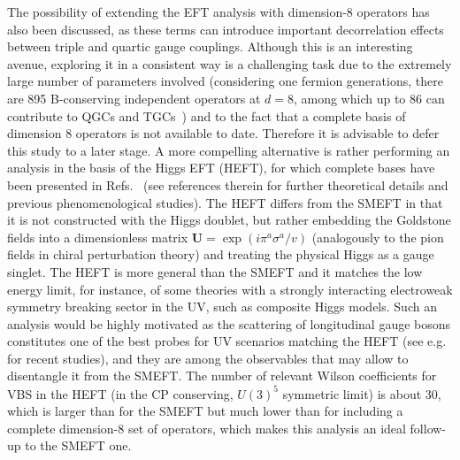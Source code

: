 The possibility of extending the EFT analysis with dimension-8 operators has also been discussed, as these terms can introduce important decorrelation effects between triple and quartic gauge couplings. Although this is an interesting avenue, exploring it in a consistent way is a challenging task due to the extremely large number of parameters involved (considering one fermion generations, there are 895 B-conserving independent operators at $d=8$, among which up to 86 can contribute to QGCs and TGCs~\cite{Henning:2015alf}) and to the fact that a complete basis of dimension 8 operators is not available to date. Therefore it is advisable to defer this study to a later stage. A more compelling alternative is rather performing an analysis in the basis of the Higgs EFT (HEFT), for which complete bases have been presented in Refs.~\cite{Buchalla:2013rka,Brivio:2016fzo} (see references therein for further theoretical details and previous phenomenological studies). The HEFT differs from the SMEFT in that it is not constructed with the Higgs doublet, but rather embedding the Goldstone fields into a dimensionless matrix $\mathbf{U}=\exp(i\pi^a\sigma^a/v)$ (analogously to the pion fields in chiral perturbation theory) and treating the physical Higgs as a gauge singlet. The HEFT is more general than the SMEFT and it matches the low energy limit, for instance, of some theories with a strongly interacting electroweak symmetry breaking sector in the UV, such as composite Higgs models. Such an analysis would be highly motivated as the scattering of longitudinal gauge bosons constitutes one of the best probes for UV scenarios matching the HEFT (see e.g.~\cite{Delgado:2013hxa,Delgado:2014jda} for recent studies), and they are among the observables that may allow to disentangle it from the SMEFT. The number of relevant Wilson coefficients for VBS in the HEFT (in the CP conserving, $U(3)^5$ symmetric limit) is about 30, which is larger than for the SMEFT but much lower than for including a complete dimension-8 set of operators, which makes this analysis an ideal follow-up to the SMEFT one.


